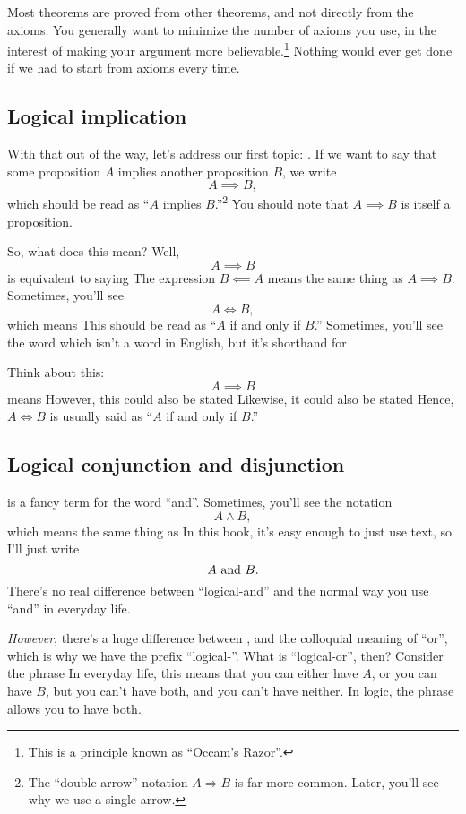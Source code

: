 Most theorems are proved from other theorems, and not directly from
the axioms. You generally want to minimize the number of axioms you
use, in the interest of making your argument more
believable.\footnote{This is a principle known as ``Occam's Razor''.}
Nothing would ever get done if we had to start from axioms every time.

\subsection{Logical implication}

With that out of the way, let's address our first topic:
. If we want to say that some proposition $A$
implies another proposition $B$, we write $$A \implies B,$$ which
should be read as ``$A$ implies $B$.''\footnote{The ``double arrow''
  notation $A \Rightarrow B$ is far more common. Later, you'll see why
  we use a single arrow.}  You should note that $A \implies B$ is
itself a proposition.

So, what does this mean? Well, $$A \implies B$$ is equivalent to
saying  The expression $B \impliedby A$ means
the same thing as $A \implies B.$ Sometimes, you'll see $$A \iff B,$$
which means  This
should be read as ``$A$ if and only if $B$.'' Sometimes, you'll see
the word  which isn't a word in English, but it's
shorthand for 

Think about this: $$A \implies B$$ means 
However, this could also be stated  Likewise, it
could also be stated  Hence, $A \iff B$ is
usually said as ``$A$ if and only if $B$.''

\subsection{Logical conjunction and disjunction}

 is a fancy term for the word
``and''. Sometimes, you'll see the notation $$A \land B,$$ which means
the same thing as  In this book, it's easy
enough to just use text, so I'll just write $$A \text{ and } B.$$ There's no
real difference between ``logical-and'' and the normal way you use
``and'' in everyday life.

\emph{However}, there's a huge difference between ,
and the colloquial meaning of ``or'', which is why we have the prefix
``logical-''. What is ``logical-or'', then? Consider the phrase
 In everyday life, this means that you can either
have $A$, or you can have $B$, but you can't have both, and you can't
have neither. In logic, the phrase  allows you to
have both.


